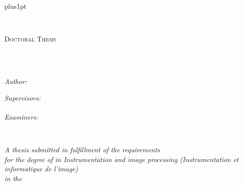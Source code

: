 \documentclass[
11pt, %
english, %
singlespacing, %
parskip, %
headsepline, %
]{MastersDoctoralThesis} %
\author{Marc Blanchon} %
\begin{document}
\baselineskip=18pt plus1pt

\frontmatter %

\pagestyle{plain} %


\begin{titlepage}
\begin{center}

\vspace*{.06\textheight}
{\scshape\LARGE \univname \\ \LARGE \edname \par}\vspace{1.5cm} %
\textsc{\Large Doctoral Thesis}\\[0.5cm] %

\HRule \\[0.4cm] %
{\huge \bfseries \ttitle\par}\vspace{0.4cm} %
\HRule \\[1.5cm] %
 
\begin{minipage}[t]{0.4\textwidth}
\begin{flushleft} \large
\emph{\textcolor{mdtRed}{Author:}}\\
\authorname %
\end{flushleft}
\end{minipage}
\begin{minipage}[t]{0.4\textwidth}
\begin{flushright} \large
\emph{\textcolor{mdtRed}{Supervisors:}} \\
\supname \\%
\emph{\textcolor{mdtRed}{Examiners:}} \\
\examname
\end{flushright}
\end{minipage}\\[1cm]
 
\vfill

\large \textit{A thesis submitted in fulfillment of the requirements\\ for the degree of \degreename \thinspace in Instrumentation and image processing (Instrumentation et informatique de l'image)}\\[0.3cm] %
\textit{in the}\\[0.4cm]
\groupname\\ \labname \\ \deptname\\[1cm] %
 

\end{center}
\end{titlepage}
\end{document}
